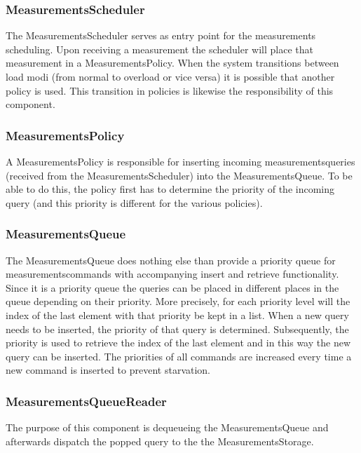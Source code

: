 \subsubsection{MeasurementsScheduler}

\npar The MeasurementsScheduler serves as entry point for the measurements
scheduling. Upon receiving a measurement the scheduler will place that
measurement in a MeasurementsPolicy. When the system transitions between load
modi (from normal to overload or vice versa) it is possible that another policy
is used. This transition in policies is likewise the responsibility of this
component.

\subsubsection{MeasurementsPolicy}

\npar A MeasurementsPolicy is responsible for inserting incoming
measurementsqueries (received from the MeasurementsScheduler) into the
MeasurementsQueue. To be able to do this, the policy first has to determine the
priority of the incoming query (and this priority is different for the various
policies).

\subsubsection{MeasurementsQueue}

\npar The MeasurementsQueue does nothing else than provide a priority queue for
measurementscommands with accompanying insert and retrieve functionality. Since
it is a priority queue the queries can be placed in different places in the
queue depending on their priority. More precisely, for each priority level will
the index of the last element with that priority be kept in a list. When a new
query needs to be inserted, the priority of that query is determined.
Subsequently, the priority is used to retrieve the index of the last element and
in this way the new query can be inserted. The priorities of all commands are
increased every time a new command is inserted to prevent starvation.

\subsubsection{MeasurementsQueueReader}

\npar The purpose of this component is dequeueing the MeasurementsQueue and
afterwards dispatch the popped query to the the MeasurementsStorage.


